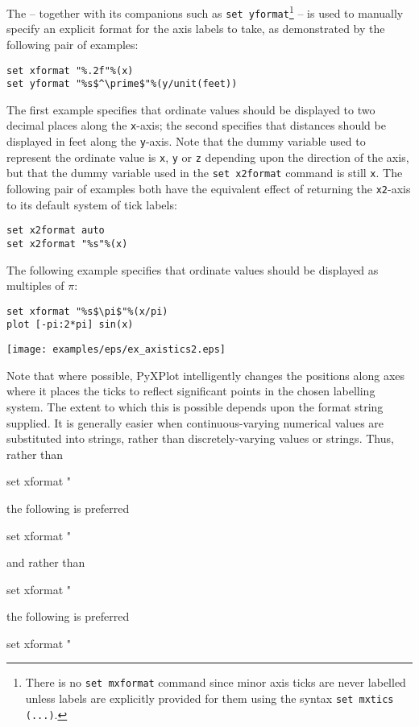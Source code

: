 The  -- together with its companions such as {\tt set
yformat}\footnote{There is no {\tt set mxformat} command since minor axis ticks
are never labelled unless labels are explicitly provided for them using the
syntax {\tt set mxtics (...)}.} -- is used to manually specify an explicit
format for the axis labels to take, as demonstrated by the following pair of
examples:
\begin{verbatim}
set xformat "%.2f"%(x)
set yformat "%s$^\prime$"%(y/unit(feet))
\end{verbatim}
The first example specifies that ordinate values should be displayed to two
decimal places along the {\tt x}-axis; the second specifies that distances should
be displayed in feet along the {\tt y}-axis. Note that the dummy variable used to
represent the ordinate value is {\tt x}, {\tt y} or {\tt z} depending upon the
direction of the axis, but that the dummy variable used in the {\tt set
x2format} command is still {\tt x}. The following pair of examples both have
the equivalent effect of returning the {\tt x2}-axis to its default system of
tick labels:
\begin{verbatim}
set x2format auto
set x2format "%s"%(x)
\end{verbatim}

The following example specifies that ordinate values should be displayed as
multiples of $\pi$:
\begin{verbatim}
set xformat "%s$\pi$"%(x/pi)
plot [-pi:2*pi] sin(x)
\end{verbatim}

\noindent\centerline{\texttt{[image: examples/eps/ex\_axistics2.eps]}}

Note that where possible, PyXPlot intelligently changes the positions along
axes where it places the ticks to reflect significant points in the chosen
labelling system.  The extent to which this is possible depends upon the format
string supplied. It is generally easier when continuous-varying numerical
values are substituted into strings, rather than discretely-varying values or
strings. Thus, rather than
\begin{dontdo}
set xformat "%
\end{dontdo}
the following is preferred
\begin{dontdo}
set xformat "%
\end{dontdo}
and rather than
\begin{dontdo}
set xformat "%
\end{dontdo}
the following is preferred
\begin{dontdo}
set xformat "%
\end{dontdo}

